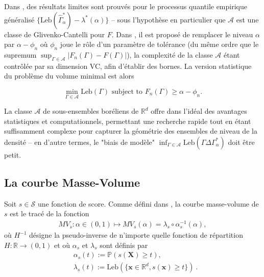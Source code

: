 \documentclass[a4paper, 12pt]{article}
\def\mb{\mathbf}
\def\rset{\mathbb{R}}
\def\leb{\text{Leb}}
\begin{document}
Dans \cite{Polonik97}, des résultats limites sont prouvés pour le processus quantile empirique généralisé $ \{\leb (\widehat {\Gamma}^*_{\alpha}) - \lambda^*(\alpha) \} $ -- sous l'hypothèse en particulier que $ \mathcal{A} $ est une classe de Glivenko-Cantelli pour $ F $. Dans \cite {Scott2006}, il est proposé de remplacer le niveau $\alpha $ par $ \alpha- \phi_n $ où $ \phi_n $ joue le rôle d'un paramètre de tolérance (du même ordre que le supremum $\sup_{\Gamma\in \mathcal{A}}\vert F_n(\Gamma)-F(\Gamma) \vert$), la complexité de la classe $ \mathcal{A} $ étant contrôlée par sa dimension {\sc VC}, afin d'établir des bornes. La version statistique du problème du volume minimal est alors

$$
\min_{\Gamma \in \mathcal{A}} \leb(\Gamma) \mbox{ subject to } F_n (\Gamma) \ge \alpha - \phi_n.
$$

La classe $ \mathcal {A} $ de sous-ensembles boréliens de $ \rset^d $ offre dans l'idéal des avantages statistiques et computationnels, permettant une recherche rapide tout en étant suffisamment complexe pour capturer la géométrie des ensembles de niveau de la densité -- en d'autre termes, le "biais de modèle" $ \inf_ {\Gamma \in \mathcal{A}} \leb (\Gamma \Delta \Gamma^*_\alpha) $ doit être petit.


\subsection{La courbe Masse-Volume}
\label{resume_fr:mv-curve}

Soit $s\in \mathcal{S}$ une fonction de score. Comme défini dans \cite{CLEM13,CLEM14}, la courbe masse-volume de $s$ est le tracé de la fonction
\begin{align*}
MV_s : \alpha\in (0,1)\mapsto MV_s(\alpha) = \lambda_s \circ \alpha_s^{-1}(\alpha),
\end{align*}
où $ H ^ {- 1} $ désigne la pseudo-inverse de n'importe quelle fonction de répartition $H: \mathbb {R} \rightarrow (0,1) $ et où $ \alpha_s $ et $ \lambda_s $ sont définis par
\begin{equation}
\begin{aligned}
\label{resume_fr:eq:alpha_beta}
&\alpha_s(t):= \mathbb{P}(s(\mb X) \ge t), \\
&\lambda_s(t):=\leb(\{\mb x \in \rset^d, s(\mb x) \ge t\})~.
\end{aligned}
\end{equation}
%
\end{document}
